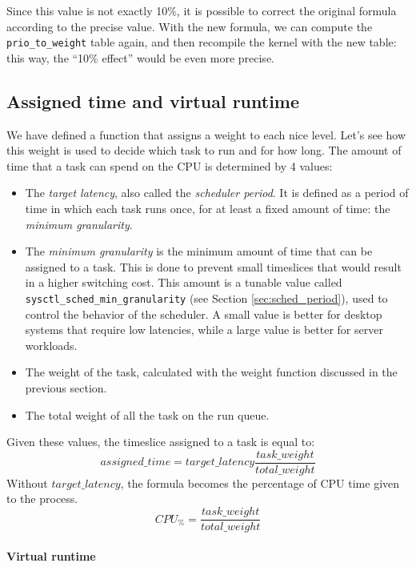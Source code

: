 Since this value is not exactly 10\%, it is possible to correct the original formula according to the precise value. With the new formula, we can compute the \verb|prio_to_weight| table again, and then recompile the kernel with the new table: this way, the ``10\% effect'' would be even more precise.

\subsection{Assigned time and virtual runtime}
We have defined a function that assigns a weight to each nice level. Let's see how this weight is used to decide which task to run and for how long. The amount of time that a task can spend on the CPU is determined by 4 values:
\begin{itemize}
    \item The \textit{target latency}, also called the \textit{scheduler period}. It is defined as a period of time in which each task runs once, for at least a fixed amount of time: the \textit{minimum granularity}.
    \item The \textit{minimum granularity} is the minimum amount of time that can be assigned to a task. This is done to prevent small timeslices that would result in a higher switching cost. This amount is a tunable value called \verb|sysctl_sched_min_granularity| (see Section \ref{sec:sched_period}), used to control the behavior of the scheduler. A small value is better for desktop systems that require low latencies, while a large value is better for server workloads.
    \item The weight of the task, calculated with the weight function discussed in the previous section.
    \item The total weight of all the task on the run queue.
\end{itemize}
Given these values, the timeslice assigned to a task is equal to:
\begin{equation} \label{eq:assigned_time}
    assigned\_time = target\_latency                  \frac{task\_weight}{total\_weight}
\end{equation}
Without $target\_latency$, the formula becomes the percentage of CPU time given to the process.
\begin{equation}
    CPU_\% = \frac{task\_weight}{total\_weight}
\end{equation}

\paragraph{Virtual runtime}

